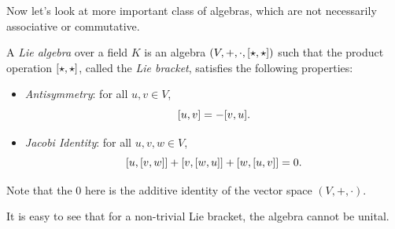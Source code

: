 Now let's look at more important class of algebras, which are not necessarily associative or commutative.
\begin{definition} \label{def:lie-algebra}
	A \emph{Lie algebra} over a field \(K\) is an algebra \((V, +, \cdot, \comm{\star}{\star})\) such that the product operation \(\comm{\star}{\star}\), called the \emph{Lie bracket}, satisfies the following properties:
	\begin{itemize}
		\item \emph{Antisymmetry}: for all \(u, v \in V\),
		      \begin{equation}
			      \comm{u}{v} = -\comm{v}{u}.
		      \end{equation}
		\item \emph{Jacobi Identity}: for all \(u, v, w \in V\),
		      \begin{equation}
			      \comm{u}{\comm{v}{w}} + \comm{v}{\comm{w}{u}} + \comm{w}{\comm{u}{v}} = 0.
		      \end{equation}
	\end{itemize}
	Note that the \(0\) here is the additive identity of the vector space \((V, +, \cdot)\).
\end{definition}
It is easy to see that for a non-trivial Lie bracket, the algebra cannot be unital.

